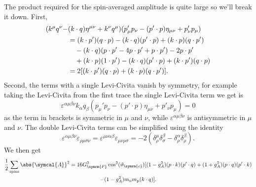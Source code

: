 \documentclass[fleqn]{NotesClass}
\newcommand{\Pparticle}[1]{\mathrm{#1}}
\newcommand{\Pp}{\ensuremath{\Pparticle{p}}}
\newcommand{\Pn}{\ensuremath{\Pparticle{n}}}
\newcommand{\amplitude}{\symcal{A}}
\newcommand{\minkowskiMetric}{\eta}
\newcommand{\fermiConst}{G_{\symrm{F}}}
\newcommand{\cabibboangle}{\vartheta_{\symrm{c}}}
\begin{document}
    The product required for the spin-averaged amplitude is quite large so we'll break it down.
    First,
    \begin{align}
        (k^\mu q^\nu - &(k \cdot q)\minkowskiMetric^{\mu\nu} + k^\nu q^\mu)(p'_\mu p_\nu - (p' \cdot p)\minkowskiMetric_{\mu\nu} + p'_\nu p_\mu)\notag\\
        &= (k \cdot p')(q \cdot p) - (k \cdot q)(p' \cdot p) + (k \cdot p)(q \cdot p')\\
        &\quad - (k \cdot q)(p \cdot p' - 4p\cdot p' + p \cdot p') - 2p\cdot p' \notag\\
        &\quad + (k \cdot p)(1 \cdot p') - (k \cdot q)(p' \cdot p) + (k \cdot p')(q \cdot p) \notag\\
        &= 2[(k \cdot p')(q \cdot p) + (k\cdot p)(q \cdot p')].
    \end{align}
    Second, the terms with a single Levi-Civita vanish by symmetry, for example taking the Levi-Civita from the first trace the single Levi-Civita term we get is
    \begin{equation}
        \varepsilon^{\alpha\mu\beta\nu}k_\alpha q_\beta(p_\mu'p_\nu - (p' \cdot p)\minkowskiMetric_{\mu\nu} + p'_\nu p_\mu) = 0
    \end{equation}
    as the term in brackets is symmetric in \(\mu\) and \(\nu\), while \(\varepsilon^{\alpha\mu\beta\nu}\) is antisymmetric in \(\mu\) and \(\nu\).
    The double Levi-Civita terms can be simplified using the identity
    \begin{equation}
        \varepsilon^{\alpha\mu\beta\nu}\varepsilon_{\rho\mu\sigma\nu} = \varepsilon^{\mu\nu\alpha\beta}\varepsilon_{\mu\nu\rho\sigma} = -2(\delta^\mu_\rho \delta^\beta_\sigma - \delta^\alpha_\rho \delta^\beta_\rho).
    \end{equation}
    We then get
    \begin{multline}
        \frac{1}{2}\sum_{\text{spins}} \abs{\amplitude}^2 = 16\fermiConst^2\cos^2(\cabibboangle) [ (1 - g_A^2)(p \cdot k)(p' \cdot q) + (1 + g_A^2)(p\cdot q)(p' \cdot k)\\
        - (1 - g_A^2)m_{\Pn}m_{\Pp}(k \cdot q) ].
    \end{multline}
    
\end{document}
